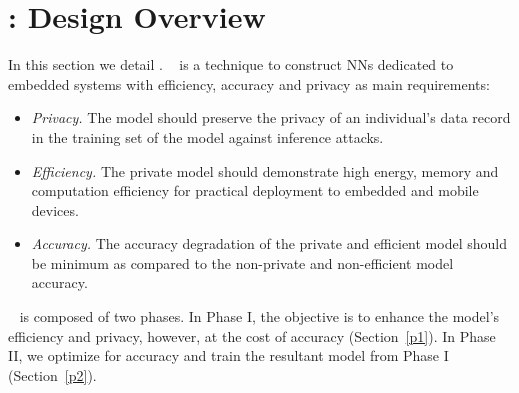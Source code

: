 \section{\method: Design Overview}\label{design}

In this section we detail \method\hspace{0.02in}.
\method~ is a technique to construct NNs dedicated to embedded systems with efficiency, accuracy and privacy as main requirements:

\begin{itemize}[leftmargin=*]

\item {\em Privacy.}
The model should preserve the privacy of an individual's data record in the training set of the model against inference attacks.

\item {\em Efficiency.}
The private model should demonstrate high energy, memory and computation efficiency for practical deployment to embedded and mobile devices.

\item {\em Accuracy.}
The accuracy degradation of the private and efficient model should be minimum as compared to the non-private and non-efficient model accuracy.
\end{itemize}


\method~ is composed of two phases.
In Phase I, the objective is to enhance the model's efficiency and privacy, however, at the cost of accuracy (Section~\ref{p1}).
In Phase II, we optimize for accuracy and train the resultant model from Phase I (Section~\ref{p2}).






